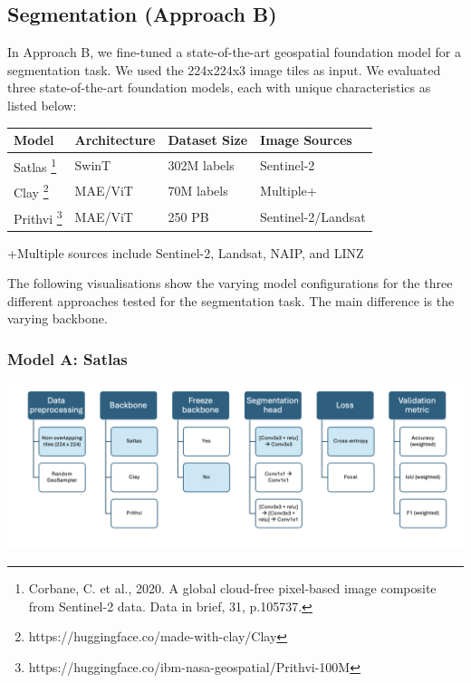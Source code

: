 \documentclass[
  letterpaper,
  DIV=11,
  numbers=noendperiod]{scrartcl}
\begin{document}
\subsection{Segmentation (Approach B)}\label{segmentation-approach-b}

In Approach B, we fine-tuned a state-of-the-art geospatial foundation
model for a segmentation task. We used the 224x224x3 image tiles as
input. We evaluated three state-of-the-art foundation models, each with
unique characteristics as listed below:

\begin{longtable}[]{@{}llll@{}}
\toprule\noalign{}
Model & Architecture & Dataset Size & Image Sources \\
\midrule\noalign{}
\endhead
\bottomrule\noalign{}
\endlastfoot
Satlas \footnote{Corbane, C. et al., 2020. A global cloud-free
  pixel-based image composite from Sentinel-2 data. Data in brief, 31,
  p.105737.} & SwinT & 302M labels & Sentinel-2 \\
Clay \footnote{https://huggingface.co/made-with-clay/Clay} & MAE/ViT &
70M labels & Multiple+ \\
Prithvi \footnote{https://huggingface.co/ibm-nasa-geospatial/Prithvi-100M}
& MAE/ViT & 250 PB & Sentinel-2/Landsat \\
\end{longtable}

+Multiple sources include Sentinel-2, Landsat, NAIP, and LINZ

The following visualisations show the varying model configurations for
the three different approaches tested for the segmentation task. The
main difference is the varying backbone.

\subsubsection{Model A: Satlas}\label{model-a-satlas}

\begin{center}
\includegraphics[width=6.25in,height=\textheight]{../figures/algo_design/satlas_model.png}
\end{center}
\end{document}
